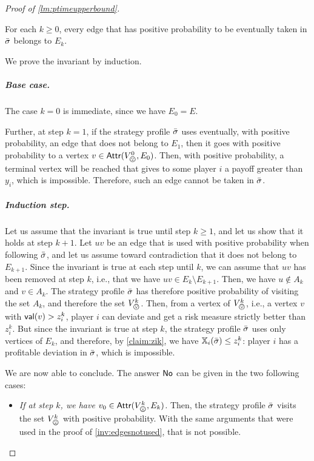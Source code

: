 \begin{proof}[Proof of \cref{lm:ptimeupperbound}]
\begin{claimproof}
        \begin{invariant} \label{inv:edgesnotused}
            For each $k \geq 0$, every edge that has positive probability to be eventually taken in ${\bar{\sigma}}$ belongs to $E_k$.
        \end{invariant}

        \begin{claimproof}
        We prove the invariant by induction. 
        
        \subparagraph*{Base case.} The case $k=0$ is immediate, since we have $E_0 = E$.
        
        Further, at step $k=1$, if the strategy profile ${\bar{\sigma}}$ uses eventually, with positive probability, an edge that does not belong to $E_1$, then it goes with positive probability to a vertex $v \in \Attr(V^0_\bad, E_0)$.
        Then, with positive probability, a terminal vertex will be reached that gives to some player $i$ a payoff greater than $y_i$, which is impossible.
        Therefore, such an edge cannot be taken in ${\bar{\sigma}}$.
        
         
        \subparagraph*{Induction step.} Let us assume that the invariant is true until step $k \geq 1$, and let us show that it holds at step $k+1$.    
        Let $uv$ be an edge that is used with positive probability when following ${\bar{\sigma}}$, and let us assume toward contradiction that it does not belong to $E_{k+1}$.
        Since the invariant is true at each step until $k$, we can assume that $uv$ has been removed at step $k$, i.e., that we have $uv \in E_k \setminus E_{k+1}$.
        Then, we have $u \not\in A_k$ and $v \in A_k$.
        The strategy profile ${\bar{\sigma}}$ has therefore positive probability of visiting the set $A_k$, and therefore the set $V_\bad^k$.
        Then, from a vertex of $V_\bad^k$, i.e., a vertex $v$ with $\mathsf{val}(v) > z_i^k$, player $i$ can deviate and get a risk measure strictly better than $z_i^k$.
        But since the invariant is true at step $k$, the strategy profile ${\bar{\sigma}}$ uses only vertices of $E_k$, and therefore, by \cref{claim:zik}, we have $\mathbb{X}_i({\bar{\sigma}}) \leq z_i^k$: player $i$ has a profitable deviation in ${\bar{\sigma}}$, which is impossible.
\end{claimproof}

         

        We are now able to conclude.
        The answer $\mathsf{No}$ can be given in the two following cases:
            \begin{itemize}
                \item \emph{If at step $k$, we have $v_0 \in \Attr(V^k_\bad, E_k)$.}
                Then, the strategy profile ${\bar{\sigma}}$ visits the set $V^k_\bad$ with positive probability.
                With the same arguments that were used in the proof of \cref{inv:edgesnotused}, that is not possible.
                

\end{itemize}
\end{claimproof}
\end{proof}
